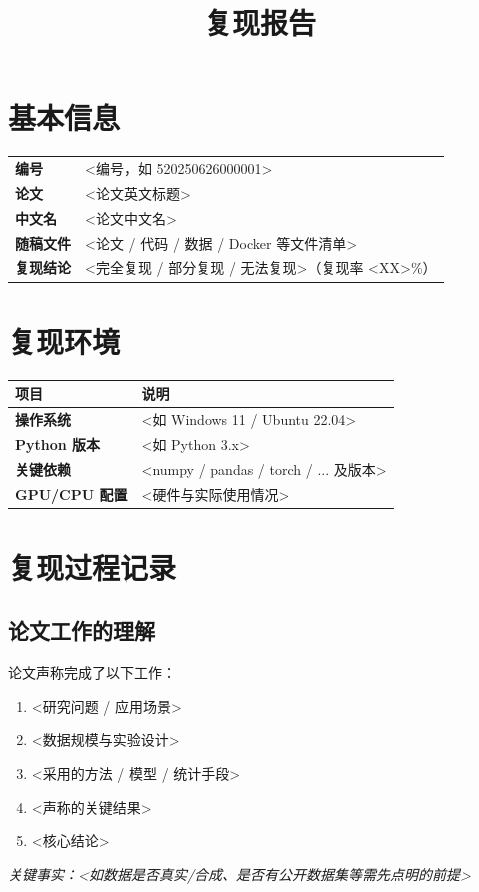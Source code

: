 \documentclass[11pt]{article}
\title{\Huge 复现报告}
\date{}
\begin{document}
\maketitle
\thispagestyle{fancy}

\section{基本信息}
\begin{center}
\begin{tabular}{>{\bfseries}l p{11cm}}
\toprule
编号    & <编号，如 520250626000001> \\
论文    & <论文英文标题> \\
中文名  & <论文中文名> \\
随稿文件 & <论文 / 代码 / 数据 / Docker 等文件清单> \\
复现结论 & <完全复现 / 部分复现 / 无法复现>（复现率 <XX>\%） \\
\bottomrule
\end{tabular}
\end{center}

\section{复现环境}
\begin{center}
\begin{tabular}{>{\bfseries}l p{10cm}}
\toprule
项目 & 说明 \\
\midrule
操作系统      & <如 Windows 11 / Ubuntu 22.04> \\
Python 版本   & <如 Python 3.x> \\
关键依赖      & <numpy / pandas / torch / ... 及版本> \\
GPU/CPU 配置  & <硬件与实际使用情况> \\
\bottomrule
\end{tabular}
\end{center}

\section{复现过程记录}

\subsection{论文工作的理解}
论文声称完成了以下工作：
\begin{enumerate}[leftmargin=2em]
  \item <研究问题 / 应用场景>
  \item <数据规模与实验设计>
  \item <采用的方法 / 模型 / 统计手段>
  \item <声称的关键结果>
  \item <核心结论>
\end{enumerate}
\noindent\textit{关键事实：<如数据是否真实/合成、是否有公开数据集等需先点明的前提>}
\end{document}
